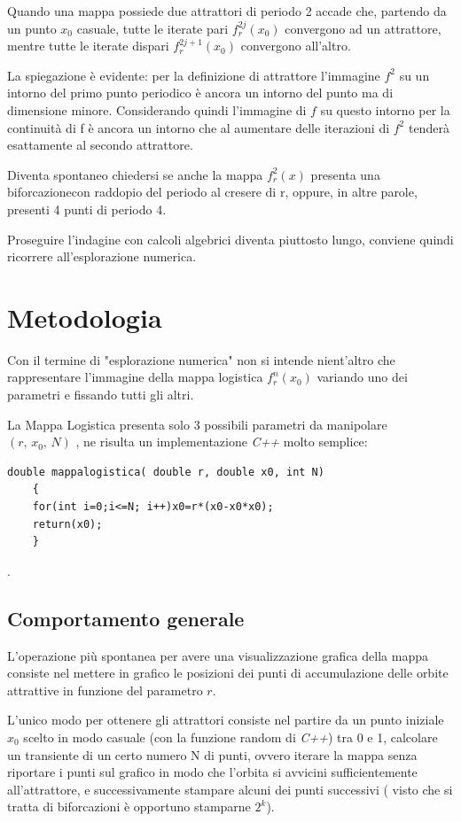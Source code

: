 \documentclass[13pt]{article}
\begin{document}
Quando una mappa possiede due attrattori di periodo 2 accade che, partendo da un punto $x_{0}$ casuale, tutte le iterate pari $f^{2j}_{r}(x_{0})$ convergono ad un attrattore, mentre tutte le iterate dispari $f^{2j+1}_{r}(x_{0})$ convergono all'altro.

La spiegazione è evidente: per la definizione di attrattore l'immagine $f^{2}$ su un intorno del primo punto periodico è ancora un intorno del punto ma di dimensione minore. Considerando quindi l'immagine di $f$ su questo intorno per la continuità di f è ancora un intorno che al aumentare delle iterazioni di $f^{2}$ tenderà esattamente al secondo attrattore. 

Diventa spontaneo chiedersi se anche la mappa $f^{2}_{r}(x)$ presenta una biforcazionecon raddopio del periodo al cresere di r, oppure, in altre parole, presenti 4 punti di periodo 4.

Proseguire l'indagine con calcoli algebrici diventa piuttosto lungo, conviene quindi ricorrere all'esplorazione numerica.




\section{Metodologia}

Con il termine di "esplorazione numerica" non si intende nient'altro che rappresentare l'immagine della mappa logistica $f^{n}_{r}(x_{0})$ variando uno dei parametri e fissando tutti gli altri.

La Mappa Logistica  presenta solo 3 possibili parametri da manipolare $(r, \, x_{0}, \, N)$ , ne risulta un implementazione \emph{C++} molto semplice:

\begin{lstlisting}[frame=single]
double mappalogistica( double r, double x0, int N)
	{
	for(int i=0;i<=N; i++)x0=r*(x0-x0*x0);
	return(x0);
	}
\end{lstlisting}
.

\subsection{Comportamento generale}

L'operazione più spontanea per avere una visualizzazione grafica della mappa consiste nel mettere in grafico le posizioni dei punti di accumulazione delle orbite attrattive in funzione del parametro $r$.

L'unico modo per ottenere gli attrattori consiste nel partire da un punto iniziale $x_{0}$ scelto in modo casuale (con la funzione random di \emph{C++}) tra 0 e 1, calcolare un transiente di un certo numero N di punti, ovvero iterare la mappa senza riportare i punti sul grafico in modo che l'orbita si avvicini sufficientemente all'attrattore, e successivamente stampare alcuni dei punti successivi ( visto che si tratta di biforcazioni è opportuno stamparne $2^{k}$).
\end{document}
